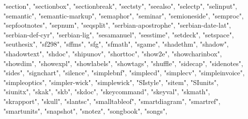 \documentclass[
]{article}
\newenvironment{Shaded}{\begin{snugshade}}{\end{snugshade}}
\newcommand{\NormalTok}[1]{#1}
\newcommand{\StringTok}[1]{\textcolor[rgb]{0.31,0.60,0.02}{#1}}
\begin{document}
\begin{Shaded}
\begin{Highlighting}[]
\StringTok{"section"}\NormalTok{, }\StringTok{"sectionbox"}\NormalTok{, }\StringTok{"sectionbreak"}\NormalTok{, }\StringTok{"sectsty"}\NormalTok{, }\StringTok{"seealso"}\NormalTok{, }
\StringTok{"selectp"}\NormalTok{, }\StringTok{"selinput"}\NormalTok{, }\StringTok{"semantic"}\NormalTok{, }\StringTok{"semantic{-}markup"}\NormalTok{, }\StringTok{"semaphor"}\NormalTok{, }
\StringTok{"seminar"}\NormalTok{, }\StringTok{"semioneside"}\NormalTok{, }\StringTok{"semproc"}\NormalTok{, }\StringTok{"sepfootnotes"}\NormalTok{, }\StringTok{"sepnum"}\NormalTok{, }
\StringTok{"seqsplit"}\NormalTok{, }\StringTok{"serbian{-}apostrophe"}\NormalTok{, }\StringTok{"serbian{-}date{-}lat"}\NormalTok{, }\StringTok{"serbian{-}def{-}cyr"}\NormalTok{, }
\StringTok{"serbian{-}lig"}\NormalTok{, }\StringTok{"sesamanuel"}\NormalTok{, }\StringTok{"sesstime"}\NormalTok{, }\StringTok{"setdeck"}\NormalTok{, }\StringTok{"setspace"}\NormalTok{, }
\StringTok{"seuthesix"}\NormalTok{, }\StringTok{"sf298"}\NormalTok{, }\StringTok{"sffms"}\NormalTok{, }\StringTok{"sfg"}\NormalTok{, }\StringTok{"sfmath"}\NormalTok{, }\StringTok{"sgame"}\NormalTok{, }\StringTok{"shadethm"}\NormalTok{, }
\StringTok{"shadow"}\NormalTok{, }\StringTok{"shadowtext"}\NormalTok{, }\StringTok{"shdoc"}\NormalTok{, }\StringTok{"shipunov"}\NormalTok{, }\StringTok{"shorttoc"}\NormalTok{, }\StringTok{"show2e"}\NormalTok{, }
\StringTok{"showcharinbox"}\NormalTok{, }\StringTok{"showdim"}\NormalTok{, }\StringTok{"showexpl"}\NormalTok{, }\StringTok{"showlabels"}\NormalTok{, }\StringTok{"showtags"}\NormalTok{, }
\StringTok{"shuffle"}\NormalTok{, }\StringTok{"sidecap"}\NormalTok{, }\StringTok{"sidenotes"}\NormalTok{, }\StringTok{"sides"}\NormalTok{, }\StringTok{"signchart"}\NormalTok{, }\StringTok{"silence"}\NormalTok{, }
\StringTok{"simplebnf"}\NormalTok{, }\StringTok{"simplecd"}\NormalTok{, }\StringTok{"simplecv"}\NormalTok{, }\StringTok{"simpleinvoice"}\NormalTok{, }\StringTok{"simpleoptics"}\NormalTok{, }
\StringTok{"simpler{-}wick"}\NormalTok{, }\StringTok{"simplewick"}\NormalTok{, }\StringTok{"SIstyle"}\NormalTok{, }\StringTok{"sitem"}\NormalTok{, }\StringTok{"SIunits"}\NormalTok{, }
\StringTok{"siunitx"}\NormalTok{, }\StringTok{"skak"}\NormalTok{, }\StringTok{"skb"}\NormalTok{, }\StringTok{"skdoc"}\NormalTok{, }\StringTok{"skeycommand"}\NormalTok{, }\StringTok{"skeyval"}\NormalTok{, }
\StringTok{"skmath"}\NormalTok{, }\StringTok{"skrapport"}\NormalTok{, }\StringTok{"skull"}\NormalTok{, }\StringTok{"slantsc"}\NormalTok{, }\StringTok{"smalltableof"}\NormalTok{, }\StringTok{"smartdiagram"}\NormalTok{, }
\StringTok{"smartref"}\NormalTok{, }\StringTok{"smartunits"}\NormalTok{, }\StringTok{"snapshot"}\NormalTok{, }\StringTok{"snotez"}\NormalTok{, }\StringTok{"songbook"}\NormalTok{, }\StringTok{"songs"}\NormalTok{, }

\end{Highlighting}
\end{Shaded}
\end{document}
